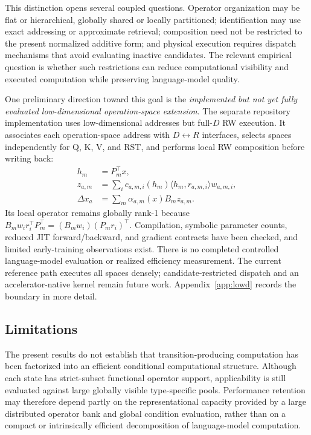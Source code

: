 \documentclass{article}
\begin{document}
This distinction opens several coupled questions. Operator organization may be
flat or hierarchical, globally shared or locally partitioned; identification
may use exact addressing or approximate retrieval; composition need not be
restricted to the present normalized additive form; and physical execution
requires dispatch mechanisms that avoid evaluating inactive candidates. The
relevant empirical question is whether such restrictions can reduce
computational visibility and executed computation while preserving
language-model quality.

One preliminary direction toward this goal is the \emph{implemented but not yet
fully evaluated low-dimensional operation-space extension}. The separate
repository implementation uses low-dimensional addresses but full-\(D\) RW
execution. It associates each
operation-space address with \(D\!\leftrightarrow\!R\) interfaces, selects
spaces independently for Q, K, V, and RST, and performs local RW composition
before writing back:
\begin{align}
h_m&=P_m^\top x,\\
z_{a,m}&=\sum_i c_{a,m,i}(h_m)
\langle h_m,r_{a,m,i}\rangle w_{a,m,i},\\
\Delta x_a&=\sum_m\alpha_{a,m}(x)B_m z_{a,m}.
\label{eq:lowd_preview}
\end{align}
Its local operator remains globally rank-1 because
\(B_m w_i r_i^\top P_m^\top=(B_mw_i)(P_mr_i)^\top\). Compilation,
symbolic parameter counts, reduced JIT forward/backward, and gradient
contracts have been checked, and limited early-training observations exist.
There is no completed controlled language-model evaluation or realized
efficiency measurement. The current reference path executes all spaces
densely; candidate-restricted dispatch and an accelerator-native kernel remain
future work. Appendix~\ref{app:lowd} records the boundary in more detail.

\subsection{Limitations}

The present results do not establish that transition-producing computation has
been factorized into an efficient conditional computational structure. Although
each state has strict-subset functional operator support, applicability is still
evaluated against large globally visible type-specific pools. Performance
retention may therefore depend partly on the representational capacity provided
by a large distributed operator bank and global condition evaluation, rather
than on a compact or intrinsically efficient decomposition of language-model
computation.
\end{document}
